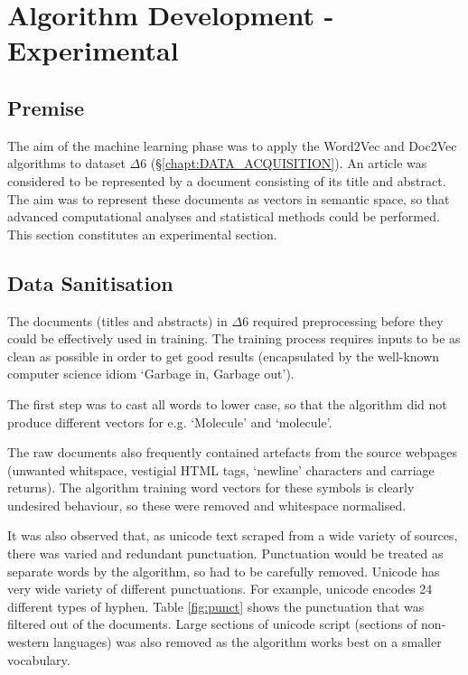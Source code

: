 \chapter{Algorithm Development - Experimental}
\label{chapt:ALGORITHM}
\section{Premise}
The aim of the machine learning phase was to apply the Word2Vec and Doc2Vec algorithms to dataset $\Delta6$ (\S\ref{chapt:DATA_ACQUISITION}). An article was considered to be represented by a document consisting of its title and abstract. The aim was to represent these documents as vectors in semantic space, so that advanced computational analyses and statistical methods could be performed. This section constitutes an experimental section.
\section{Data Sanitisation} 
The documents (titles and abstracts) in $\Delta6$ required preprocessing before they could be effectively used in training. The training process requires inputs to be as clean as possible in order to get good results (encapsulated by the well-known computer science idiom `Garbage in, Garbage out'). 

The first step was to cast all words to lower case, so that the algorithm did not produce different vectors for e.g.  `Molecule' and `molecule'.

The raw documents also frequently contained artefacts from the source webpages (unwanted whitspace, vestigial HTML tags, `newline' characters and carriage returns). The algorithm training word vectors for these symbols is clearly undesired behaviour, so these were removed and whitespace normalised.

It was also observed that, as unicode text scraped from a wide variety of sources, there was varied and redundant punctuation. Punctuation would be treated as separate words by the algorithm, so had to be carefully removed. Unicode has very wide variety of different punctuations. For example, unicode encodes 24 different types of hyphen. Table \ref{fig:punct} shows the punctuation that was filtered out of the documents. Large sections of unicode script (sections of non-western languages) was also removed as the algorithm works best on a smaller vocabulary.

